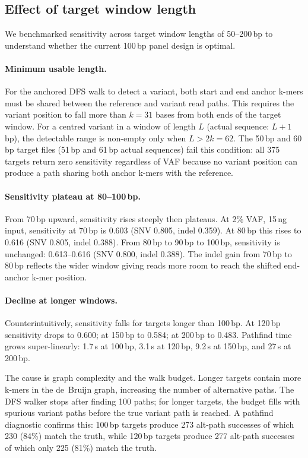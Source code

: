 \subsection{Effect of target window length}
\label{sec:eval:targetlength}

We benchmarked sensitivity across target window lengths of 50--200\,bp to
understand whether the current 100\,bp panel design is optimal.

\paragraph{Minimum usable length.}
For the anchored DFS walk to detect a variant, both start and end anchor
k-mers must be shared between the reference and variant read paths. This
requires the variant position to fall more than $k=31$ bases from both ends
of the target window. For a centred variant in a window of length $L$ (actual
sequence: $L+1$\,bp), the detectable range is non-empty only when $L > 2k = 62$.
The 50\,bp and 60\,bp target files (51\,bp and 61\,bp actual sequences) fail
this condition: all 375 targets return zero sensitivity regardless of VAF
because no variant position can produce a path sharing both anchor k-mers
with the reference.

\paragraph{Sensitivity plateau at 80--100\,bp.}
From 70\,bp upward, sensitivity rises steeply then plateaus.
At 2\% VAF, 15\,ng input, sensitivity at 70\,bp is 0.603 (SNV 0.805, indel 0.359).
At 80\,bp this rises to 0.616 (SNV 0.805, indel 0.388).
From 80\,bp to 90\,bp to 100\,bp, sensitivity is unchanged: 0.613--0.616
(SNV 0.800, indel 0.388).
The indel gain from 70\,bp to 80\,bp reflects the wider window giving reads
more room to reach the shifted end-anchor k-mer position.

\paragraph{Decline at longer windows.}
Counterintuitively, sensitivity falls for targets longer than 100\,bp.
At 120\,bp sensitivity drops to 0.600; at 150\,bp to 0.584; at 200\,bp to 0.483.
Pathfind time grows super-linearly: 1.7\,s at 100\,bp, 3.1\,s at 120\,bp,
9.2\,s at 150\,bp, and 27\,s at 200\,bp.

The cause is graph complexity and the walk budget. Longer targets contain more
k-mers in the de~Bruijn graph, increasing the number of alternative paths.
The DFS walker stops after finding 100 paths; for longer targets, the budget
fills with spurious variant paths before the true variant path is reached.
A pathfind diagnostic confirms this: 100\,bp targets produce 273 alt-path
successes of which 230 (84\%) match the truth, while 120\,bp targets produce
277 alt-path successes of which only 225 (81\%) match the truth.

